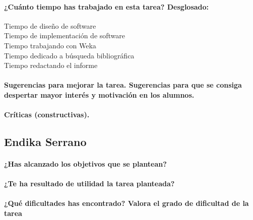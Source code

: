 \documentclass[11pt, titlepage,a4paper]{article}
\begin{document}
\paragraph{¿Cuánto tiempo has trabajado en esta tarea? Desglosado:\\}
\begin{description}
	\item[Tiempo de diseño de software]
	\item[Tiempo de implementación de software]
	\item[Tiempo trabajando con Weka]
	\item[Tiempo dedicado a búsqueda bibliográfica]
	\item[Tiempo redactando el informe]
\end{description}

\paragraph{Sugerencias para mejorar la tarea. Sugerencias para que se consiga despertar mayor
interés y motivación en los alumnos.\\}

\paragraph{ Críticas (constructivas).\\}

\subsection{Endika Serrano}
\paragraph{¿Has alcanzado los objetivos que se plantean?\\}

\paragraph{¿Te ha resultado de utilidad la tarea planteada?\\}

\paragraph{¿Qué dificultades has encontrado? Valora el grado de dificultad de
la tarea\\}
\end{document}
